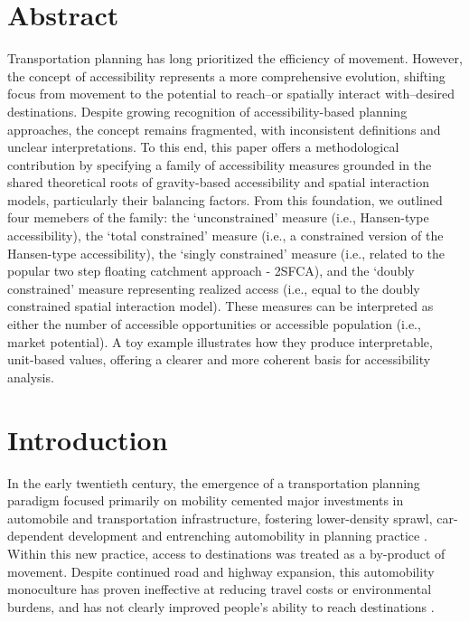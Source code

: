 \documentclass[
  10pt,
  letterpaper,
]{article}
\begin{document}
\section*{Abstract}
Transportation planning has long prioritized the efficiency of movement.
However, the concept of accessibility represents a more comprehensive
evolution, shifting focus from movement to the potential to reach--or
spatially interact with--desired destinations. Despite growing
recognition of accessibility-based planning approaches, the concept
remains fragmented, with inconsistent definitions and unclear
interpretations. To this end, this paper offers a methodological
contribution by specifying a family of accessibility measures grounded
in the shared theoretical roots of gravity-based accessibility and
spatial interaction models, particularly their balancing factors. From
this foundation, we outlined four memebers of the family: the
`unconstrained' measure (i.e., Hansen-type accessibility), the `total
constrained' measure (i.e., a constrained version of the Hansen-type
accessibility), the `singly constrained' measure (i.e., related to the
popular two step floating catchment approach - 2SFCA), and the `doubly
constrained' measure representing realized access (i.e., equal to the
doubly constrained spatial interaction model). These measures can be
interpreted as either the number of accessible opportunities or
accessible population (i.e., market potential). A toy example
illustrates how they produce interpretable, unit-based values, offering
a clearer and more coherent basis for accessibility analysis.


\linenumbers
\section{Introduction}\label{introduction}

In the early twentieth century, the emergence of a transportation
planning paradigm focused primarily on mobility cemented major
investments in automobile and transportation infrastructure, fostering
lower-density sprawl, car-dependent development and entrenching
automobility in planning practice
\citep{miller_collaborative_2011, lavery_driving_2013}. Within this new
practice, access to destinations was treated as a by-product of
movement. Despite continued road and highway expansion, this
automobility monoculture has proven ineffective at reducing travel costs
or environmental burdens, and has not clearly improved people's ability
to reach destinations
\citep{farber_running_2011, handyACCESSIBILITYVSMOBILITYENHANCING2002, paez_healthcare_2010}.
\end{document}
